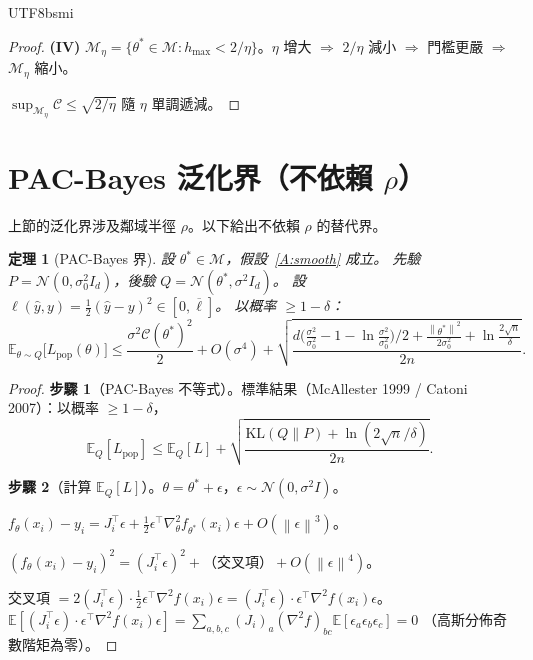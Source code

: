 \documentclass[11pt,a4paper]{article}
\newtheorem{theorem}{定理}
\theoremstyle{definition}
\newcommand{\E}{\mathbb{E}}
\newcommand{\cM}{\mathcal{M}}
\newcommand{\cC}{\mathcal{C}}
\newcommand{\norm}[1]{\left\|#1\right\|}
\begin{document}
\begin{CJK}{UTF8}{bsmi}
\begin{proof}
  \textbf{(IV)} $\cM_\eta=\{\theta^*\in\cM:h_{\max}<2/\eta\}$。$\eta$ 增大 $\Rightarrow$ $2/\eta$ 減小 $\Rightarrow$ 門檻更嚴 $\Rightarrow$ $\cM_\eta$ 縮小。

  $\sup_{\cM_\eta}\cC\leq\sqrt{2/\eta}$ 隨 $\eta$ 單調遞減。
\end{proof}

\section{PAC-Bayes 泛化界（不依賴 $\rho$）}

上節的泛化界涉及鄰域半徑 $\rho$。以下給出不依賴 $\rho$ 的替代界。

\begin{theorem}[PAC-Bayes 界]\label{thm:pb}
  設 $\theta^*\in\cM$，假設~\ref{A:smooth} 成立。
  先驗 $P=\mathcal{N}(0,\sigma_0^2 I_d)$，後驗 $Q=\mathcal{N}(\theta^*,\sigma^2 I_d)$。
  設 $\ell(\hat{y},y)=\frac{1}{2}(\hat{y}-y)^2\in[0,\overline{\ell}]$。
  以概率 $\geq 1-\delta$：
  \begin{equation}\label{eq:pb}
    \E_{\theta\sim Q}\bigl[L_{\mathrm{pop}}(\theta)\bigr]
    \leq\frac{\sigma^2\cC(\theta^*)^2}{2}+O(\sigma^4)
    +\sqrt{\frac{d\bigl(\frac{\sigma^2}{\sigma_0^2}-1-\ln\frac{\sigma^2}{\sigma_0^2}\bigr)/2
    +\frac{\norm{\theta^*}^2}{2\sigma_0^2}+\ln\frac{2\sqrt{n}}{\delta}}{2n}}.
  \end{equation}
\end{theorem}

\begin{proof}
  \textbf{步驟 1}（PAC-Bayes 不等式）。標準結果（McAllester 1999 / Catoni 2007）：以概率 $\geq 1-\delta$，
  \[
    \E_{Q}[L_{\mathrm{pop}}]\leq\E_Q[L]+\sqrt{\frac{\mathrm{KL}(Q\|P)+\ln(2\sqrt{n}/\delta)}{2n}}.
  \]

  \textbf{步驟 2}（計算 $\E_Q[L]$）。$\theta=\theta^*+\epsilon$，$\epsilon\sim\mathcal{N}(0,\sigma^2 I)$。

  $f_\theta(x_i)-y_i=J_i^\top\epsilon+\frac{1}{2}\epsilon^\top\nabla^2_\theta f_{\theta^*}(x_i)\epsilon+O(\norm{\epsilon}^3)$。

  $(f_\theta(x_i)-y_i)^2=(J_i^\top\epsilon)^2+\text{（交叉項）}+O(\norm{\epsilon}^4)$。

  交叉項 $=2(J_i^\top\epsilon)\cdot\frac{1}{2}\epsilon^\top\nabla^2 f(x_i)\epsilon
  =(J_i^\top\epsilon)\cdot\epsilon^\top\nabla^2 f(x_i)\epsilon$。
  $\E[(J_i^\top\epsilon)\cdot\epsilon^\top\nabla^2 f(x_i)\epsilon]
  =\sum_{a,b,c}(J_i)_a(\nabla^2 f)_{bc}\E[\epsilon_a\epsilon_b\epsilon_c]=0$
  （高斯分佈奇數階矩為零）。


\end{proof}
\end{CJK}
\end{document}
